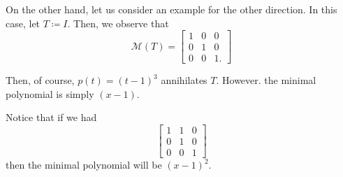 \documentclass[openany]{book}
\begin{document}
\begin{example}
	On the other hand, let us consider an example for the other direction. In this case, let $T \coloneq I$. Then, we observe that
	\begin{equation*}
		\mathcal M(T) =
		\begin{bmatrix}
			1 &0&0\\0&1&0\\0&0&1.
		\end{bmatrix}
	\end{equation*}
	
	Then, of course, $p(t) = (t-1)^{3}$ annihilates $T$. However. the minimal polynomial is simply $(x-1)$.
	
	Notice that if we had
	\begin{equation*}
		\begin{bmatrix}
			1 & 1&0\\0&1&0\\0&0&1
		\end{bmatrix}
	\end{equation*}
	then the minimal polynomial will be $(x-1)^{2}$.
\end{example}
\end{document}
